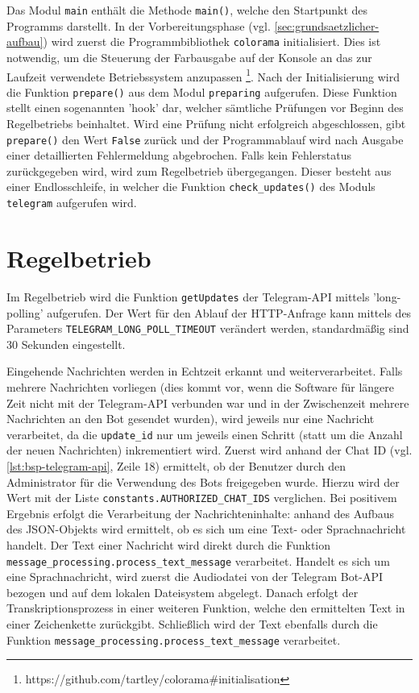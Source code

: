 Das Modul \lstinline{main} enthält die Methode \lstinline{main()}, welche den Startpunkt des Programms darstellt. In der Vorbereitungsphase (vgl. \autoref{sec:grundsaetzlicher-aufbau}) wird zuerst die Programmbibliothek \lstinline{colorama} initialisiert. Dies ist notwendig, um die Steuerung der Farbausgabe auf der Konsole an das zur Laufzeit verwendete Betriebssystem anzupassen \footnote{https://github.com/tartley/colorama\#initialisation}. Nach der Initialisierung wird die Funktion \lstinline{prepare()} aus dem Modul \lstinline{preparing} aufgerufen. Diese Funktion stellt einen sogenannten 'hook' dar, welcher sämtliche Prüfungen vor Beginn des Regelbetriebs beinhaltet. Wird eine Prüfung nicht erfolgreich abgeschlossen, gibt \lstinline{prepare()} den Wert \lstinline{False} zurück und der Programmablauf wird nach Ausgabe einer detaillierten Fehlermeldung abgebrochen. Falls kein Fehlerstatus zurückgegeben wird, wird zum Regelbetrieb übergegangen. Dieser besteht aus einer Endlosschleife, in welcher die Funktion \lstinline{check_updates()} des Moduls \lstinline{telegram} aufgerufen wird.

\section{Regelbetrieb}

Im Regelbetrieb wird die Funktion \lstinline{getUpdates} der Telegram-API mittels 'long-polling' aufgerufen. Der Wert für den Ablauf der HTTP-Anfrage kann mittels des Parameters \lstinline{TELEGRAM_LONG_POLL_TIMEOUT} verändert werden, standardmäßig sind 30 Sekunden eingestellt.

Eingehende Nachrichten werden in Echtzeit erkannt und weiterverarbeitet. Falls mehrere Nachrichten vorliegen (dies kommt vor, wenn die Software für längere Zeit nicht mit der Telegram-API verbunden war und in der Zwischenzeit mehrere Nachrichten an den Bot gesendet wurden), wird jeweils nur eine Nachricht verarbeitet, da die \lstinline{update_id} nur um jeweils einen Schritt (statt um die Anzahl der neuen Nachrichten) inkrementiert wird. Zuerst wird anhand der Chat ID (vgl. \autoref{lst:bsp-telegram-api}, Zeile 18) ermittelt, ob der Benutzer durch den Administrator für die Verwendung des Bots freigegeben wurde. Hierzu wird der Wert mit der Liste \lstinline{constants.AUTHORIZED_CHAT_IDS} verglichen. Bei positivem Ergebnis erfolgt die Verarbeitung der Nachrichteninhalte: anhand des Aufbaus des JSON-Objekts wird ermittelt, ob es sich um eine Text- oder Sprachnachricht handelt. Der Text einer Nachricht wird direkt durch die Funktion \lstinline{message_processing.process_text_message} verarbeitet. Handelt es sich um eine Sprachnachricht, wird zuerst die Audiodatei von der Telegram Bot-API bezogen und auf dem lokalen Dateisystem abgelegt. Danach erfolgt der Transkriptionsprozess in einer weiteren Funktion, welche den ermittelten Text in einer Zeichenkette zurückgibt. Schließlich wird der Text ebenfalls durch die Funktion \lstinline{message_processing.process_text_message} verarbeitet.

